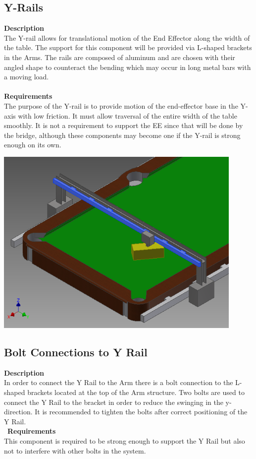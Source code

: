 \documentclass[titlepage]{article}
\begin{document}
\subsection{Y-Rails}
\textbf{Description}\\
The Y-rail allows for translational motion of the End Effector along the width of the table. The support for this component will be provided via L-shaped brackets in the Arms. The rails are composed of aluminum and are chosen with their angled shape to counteract the bending which may occur in long metal bars with a moving load.
\\~\\
\textbf{Requirements}\\
The purpose of the Y-rail is to provide motion of the end-effector base in the Y-axis with low friction. It must allow traversal of the entire width of the table smoothly. It is not a requirement to support the EE since that will be done by the bridge, although these components may become one if the Y-rail is strong enough on its own.
\begin{center}
	\includegraphics[width = 0.9\textwidth]{yRail1.png} 		%
\label{fig:yRailFig}
\end{center}

\subsection{Bolt Connections to Y Rail}
\textbf{Description}\\
In order to connect the Y Rail to the Arm there is a bolt connection to the L-shaped brackets located at the top of the Arm structure. Two bolts are used to connect the Y Rail to the bracket in order to reduce the swinging in the y-direction. It is recommended to tighten the bolts after correct positioning of the Y Rail.\\\
\textbf{Requirements}\\
This component is required to be strong enough to support the Y Rail but also not to interfere with other bolts in the system.
\end{document}
